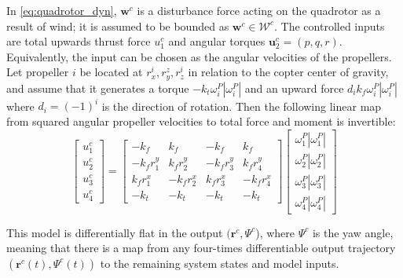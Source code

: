 \documentclass[conference]{IEEEtran}
\begin{document}
In \eqref{eq:quadrotor_dyn}, $\mathbf{w}^c$ is a disturbance force acting on the quadrotor as a result of wind; it is assumed to be bounded as $\mathbf{w}^c \in \mathcal W^c$. The controlled inputs are total upwards thrust force $u_1^c$ and angular torques $\mathbf{u}^c_2 = (p,q,r)$. Equivalently, the input can be chosen as the angular velocities of the propellers. Let propeller $i$ be located at $r_x^i, r_y^z, r_z^i$ in relation to the copter center of gravity, and assume that it generates a torque $- k_t \omega_i^P |\omega_i^P|$ and an upward force $d_i k_f \omega_i^P |\omega_i^P|$ where $d_i = (-1)^i$ is the direction of rotation. Then the following linear map from squared angular propeller velocities to total force and moment is invertible:
\begin{equation}
\begin{bmatrix}
  u_1^c \\
  u_2^c \\
  u_3^c \\
  u_4^c
\end{bmatrix} =
\begin{bmatrix}
  -k_f  & k_f& -k_f&  k_f \\
    -k_f r_1^y &   k_f r_2^y &  -k_f r_3^y &   k_f r_4^y \\
     k_f r_1^x &  -k_f r_2^x &   k_f r_3^x  & -k_f r_4^x \\
     -k_t  &     -k_t    &   -k_t       & -k_t
\end{bmatrix}
\begin{bmatrix}
  \omega^P_1 |\omega^P_1| \\
  \omega^P_2 |\omega^P_2| \\
  \omega^P_3 |\omega^P_3| \\
  \omega^P_4 |\omega^P_4|
\end{bmatrix}
\end{equation}

This model is differentially flat in the output $(\mathbf{r}^c, \Psi^c$), where $\Psi^c$ is the yaw angle, meaning that there is a map from any four-times differentiable output trajectory $(\mathbf{r}^c(t), \Psi^c(t))$ to the remaining system states and model inputs.
\end{document}
